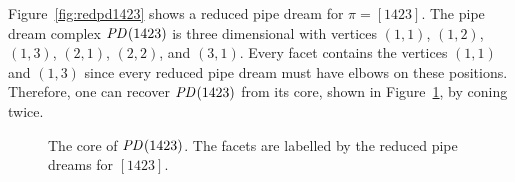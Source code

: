 \documentclass[ALCO,ThmDefs]{cedram}
\numberwithin{equation}{section}
\newcommand*\petit[1]{{\scriptstyle #1}}
\newcommand*\jr{\smash{\raise2pt\hbox{\co \rlap{\rlap{\char'005} \char'007}}\raise6pt\hbox{\rlap{\vrule height6.5pt}}\raise2pt\hbox{\rlap{\hskip4pt \vrule height0.4pt depth0pt width7.7pt}}}}
\newcommand*\je{\smash{\raise2pt\hbox{\co \rlap{\rlap{\char'005}\phantom{\char'007}}}\raise6pt\hbox{\rlap{\vrule height6pt}}}}
\newcommand*\+{\smash{\lower2pt\hbox{\rlap{\vrule height14pt}}\raise2pt\hbox{\rlap{\hskip-3pt \vrule height.4pt depth0pt width14.7pt}}}}
\newcommand*\perm[2]{\hbox{\rlap{$\petit {#1}_{\scriptscriptstyle #2}$}}\phantom{\petit 1}}
\newcommand*{\MK}{\mkern 2mu}
\DeclareMathOperator{\PD}{\textit{PD}\MK}
\begin{document}
\begin{exem}
Figure~\ref{fig:redpd1423} shows a reduced pipe dream for $\pi=[1423]$.
The pipe dream complex $\PD(1423)$ is three dimensional with vertices $(1,1)$, $(1,2)$, $(1,3)$, $(2,1)$, $(2,2)$, and $(3,1)$. Every facet contains the vertices $(1,1)$ and $(1,3)$ since every reduced pipe dream must have elbows on these positions. Therefore, one can recover $\PD(1423)$ from its core, shown in Figure~\ref{fig:core1423}, by coning twice.

\begin{figure}[h]
\begingroup
\arraycolsep=5pt
\endgroup
\caption{The core of $\PD(1423)$. The facets are labelled by the reduced pipe dreams for $[1423]$.}\label{fig:core1423}
\end{figure}
\end{exem}
\end{document}
